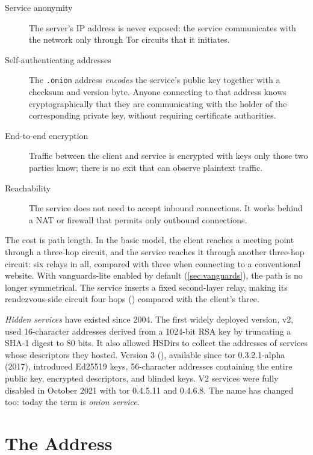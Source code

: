 \begin{description}
  \item[Service anonymity] The server's IP address is never exposed: the service communicates with the network only through Tor circuits that it initiates.
  \item[Self-authenticating addresses] The \texttt{.onion} address \emph{encodes} the service's public key together with a checksum and version byte. Anyone connecting to that address knows cryptographically that they are communicating with the holder of the corresponding private key, without requiring certificate authorities.
  \item[End-to-end encryption] Traffic between the client and service is encrypted with keys only those two parties know; there is no exit that can observe plaintext traffic.
  \item[Reachability] The service does not need to accept inbound connections. It works behind a NAT or firewall that permits only outbound connections.
\end{description}

The cost is path length. In the basic model, the client reaches a meeting point through a three-hop circuit, and the service reaches it through another three-hop circuit: six relays in all, compared with three when connecting to a conventional website. With vanguards-lite enabled by default (\cref{sec:vanguards}), the path is no longer symmetrical. The service inserts a fixed second-layer relay, making its rendezvous-side circuit four hops () compared with the client's three.

\begin{storia}[From v2 to v3]
\emph{Hidden services} have existed since 2004. The first widely deployed version, v2, used 16-character addresses derived from a 1024-bit RSA key by truncating a SHA-1 digest to 80 bits. It also allowed HSDirs to collect the addresses of services whose descriptors they hosted. Version 3 (), available since tor 0.3.2.1-alpha (2017), introduced Ed25519 keys, 56-character addresses containing the entire public key, encrypted descriptors, and blinded keys. V2 services were fully disabled in October 2021 with tor 0.4.5.11 and 0.4.6.8. The name has changed too: today the term is \emph{onion service}.
\end{storia}

\section{The Address}\label{sec:os-indirizzo}

